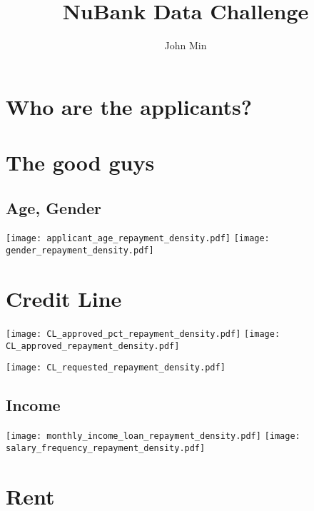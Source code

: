 \documentclass[a4paper, landscape]{article}
\begin{document}
\title{NuBank Data Challenge}

\author{John Min}
\maketitle

\tableofcontents

\newpage

\section*{Who are the applicants?}




\section*{The good guys}
\graphicspath{ {/home/lj/ML/NuBank/Plots/} }

\newpage

\subsection*{Age, Gender}


\begin{center}
\texttt{[image: applicant\_age\_repayment\_density.pdf]}
\texttt{[image: gender\_repayment\_density.pdf]}
\end{center}

\section*{Credit Line}
\texttt{[image: CL\_approved\_pct\_repayment\_density.pdf]}
\texttt{[image: CL\_approved\_repayment\_density.pdf]}


\texttt{[image: CL\_requested\_repayment\_density.pdf]}

\newpage

\subsection*{Income}

\texttt{[image: monthly\_income\_loan\_repayment\_density.pdf]}
\texttt{[image: salary\_frequency\_repayment\_density.pdf]}

\newpage
\section*{Rent}
\end{document}
